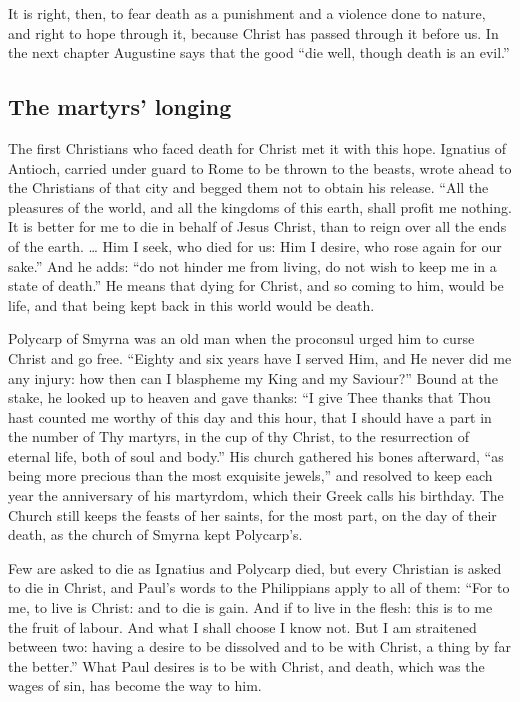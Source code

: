 It is right, then, to fear death as a punishment and a violence done to nature, and right to hope through it, because Christ has passed through it before us. In the next chapter Augustine says that the good ``die well, though death is an evil.''

\subsection{The martyrs' longing}

The first Christians who faced death for Christ met it with this hope. Ignatius of Antioch, carried under guard to Rome to be thrown to the beasts, wrote ahead to the Christians of that city and begged them not to obtain his release. ``All the pleasures of the world, and all the kingdoms of this earth, shall profit me nothing. It is better for me to die in behalf of Jesus Christ, than to reign over all the ends of the earth. \ldots{} Him I seek, who died for us: Him I desire, who rose again for our sake.'' And he adds: ``do not hinder me from living, do not wish to keep me in a state of death.'' He means that dying for Christ, and so coming to him, would be life, and that being kept back in this world would be death.

Polycarp of Smyrna was an old man when the proconsul urged him to curse Christ and go free. ``Eighty and six years have I served Him, and He never did me any injury: how then can I blaspheme my King and my Saviour?'' Bound at the stake, he looked up to heaven and gave thanks: ``I give Thee thanks that Thou hast counted me worthy of this day and this hour, that I should have a part in the number of Thy martyrs, in the cup of thy Christ, to the resurrection of eternal life, both of soul and body.'' His church gathered his bones afterward, ``as being more precious than the most exquisite jewels,'' and resolved to keep each year the anniversary of his martyrdom, which their Greek calls his birthday. The Church still keeps the feasts of her saints, for the most part, on the day of their death, as the church of Smyrna kept Polycarp's.

Few are asked to die as Ignatius and Polycarp died, but every Christian is asked to die in Christ, and Paul's words to the Philippians apply to all of them: ``For to me, to live is Christ: and to die is gain. And if to live in the flesh: this is to me the fruit of labour. And what I shall choose I know not. But I am straitened between two: having a desire to be dissolved and to be with Christ, a thing by far the better.'' What Paul desires is to be with Christ, and death, which was the wages of sin, has become the way to him.

